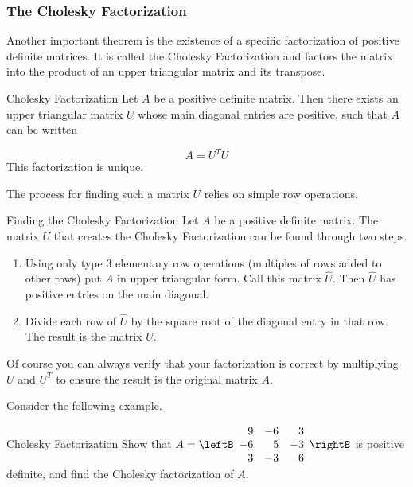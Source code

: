 \subsubsection{The Cholesky Factorization}

Another important theorem is the existence of a specific factorization of positive definite matrices. It is called the Cholesky Factorization and factors the matrix into the product of an upper triangular matrix and its transpose.

\begin{theorem}{Cholesky Factorization}\label{thm:choleskyfactorization}
Let $A$ be a positive definite matrix. Then
there exists an upper triangular matrix $U$ whose main diagonal entries are positive, such that $A$ can be written

\begin{equation*}
A=
U^TU
\end{equation*}
This factorization is unique.
\end{theorem}

The process for finding such a matrix $U$ relies on simple row operations.

\begin{procedure}{Finding the Cholesky Factorization}\label{proc:findingcholesky}
Let $A$ be a positive definite matrix. The matrix $U$ that creates the Cholesky Factorization can be found through two steps.
\begin{enumerate}
\item Using only type $3$ elementary row operations (multiples of rows added to other rows) put $A$ in upper triangular form. Call this matrix $\hat{U}$. Then $\hat{U}$ has positive entries on the main diagonal. 
\item Divide each row of $\hat{U}$ by the square root of the diagonal entry in that row. The result is the matrix $U$. 
\end{enumerate}
\end{procedure}

Of course you can always verify that your factorization is correct by multiplying $U$ and $U^T$ to ensure the result is the original matrix $A$. 

Consider the following example.

\begin{example}{Cholesky Factorization}\label{exa:cholesky}
Show that
$A=\leftB\begin{array}{rrr}
9 & -6 & 3 \\ -6 & 5 & -3 \\ 3 & -3 & 6 
\end{array}\rightB$ 
is positive definite, and find the Cholesky factorization of $A$.
\end{example}

